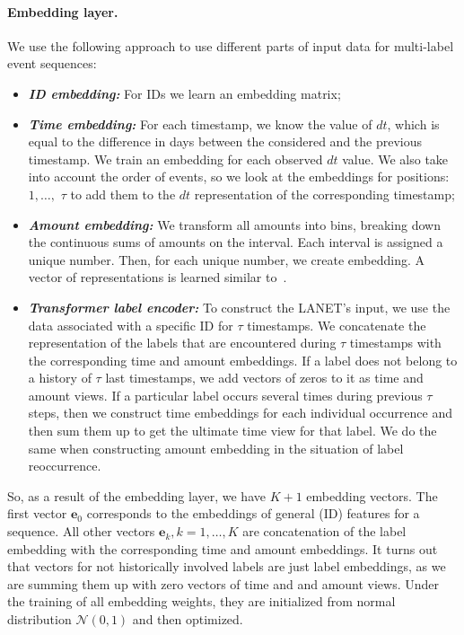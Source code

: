 \documentclass[runningheads]{llncs}
\newcommand{\vecE}{\mathbf{e}}
\begin{document}
\paragraph{\textbf{Embedding layer.}} We use the following approach to use different parts of input data for multi-label event sequences:
\begin{itemize}
    \item \textbf{\emph{ID embedding:}} For IDs we learn an embedding matrix;
    \item \textbf{\emph{Time embedding:}} For each timestamp, we know the value of $dt$, which is equal to the difference in days between the considered and the previous timestamp. We train an embedding for each observed $dt$ value. We also take into account the order of events, so we look at the embeddings for positions: $1, \dots,$ \textit{$\tau$} to add them to the $dt$ representation of the corresponding timestamp; 
    \item \textbf{\emph{Amount embedding:}} We transform all amounts into bins, breaking down the continuous sums of amounts on the interval. Each interval is assigned a unique number. Then, for each unique number, we create embedding. A vector of representations is learned similar to~\cite{fursov2021adversarial}. 
    \item \textbf{\emph{Transformer label encoder:}} To construct the LANET's input, we use the data associated with a specific ID for \textit{$\tau$} timestamps. We concatenate the representation of the labels that are encountered during \textit{$\tau$} timestamps with the corresponding time and amount embeddings. If a label does not belong to a history of \textit{$\tau$} last timestamps, we add vectors of zeros to it as time and amount views. If a particular label occurs several times during previous \textit{$\tau$} steps, then we construct time embeddings for each individual occurrence and then sum them up to get the ultimate time view for that label. We do the same when constructing amount embedding in the situation of label reoccurrence.
\end{itemize}

So, as a result of the embedding layer, we have $K + 1$ embedding vectors. 
The first vector $\vecE_0$ corresponds to the embeddings of general (ID) features for a sequence.
All other vectors $\vecE_k, k = 1, \dots, K$ are concatenation of the label embedding with the corresponding time and amount embeddings. It turns out that vectors for not historically involved labels are just label embeddings, as we are summing them up with zero vectors of time and and amount views.
Under the training of all embedding weights, they are initialized from normal distribution $\mathcal{N}(0, 1)$ and then optimized.
\end{document}
